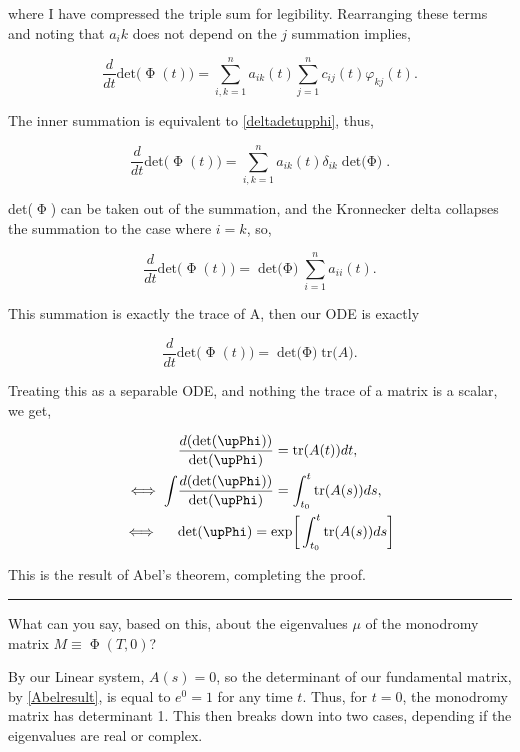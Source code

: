 \documentclass[12pt]{article}
\newcommand{\jump}{\vspace{5mm}}
\begin{document}
\begin{enumerate}[]
\begin{solution}
        where I have compressed the triple sum for legibility. Rearranging these terms and noting that $a_ik$ does not depend on the $j$ summation implies,

        \[
        \frac{d}{dt}\text{det($\upPhi(t)$)} = \sum_{i,k = 1}^na_{ik}(t)\sum_{j = 1}^n c_{ij}(t)\varphi_{kj}(t).
        \]

        The inner summation is equivalent to \ref{deltadetupphi}, thus,

        \[        
        \frac{d}{dt}\text{det($\upPhi(t)$)} = \sum_{i,k = 1}^na_{ik}(t)\delta_{ik}\text{det($\upPhi$)}.
        \]

        det($\upPhi$) can be taken out of the summation, and the Kronnecker delta collapses the summation to the case where $i = k$, so,

        \[        
        \frac{d}{dt}\text{det($\upPhi(t)$)} = \text{det($\upPhi$)}\sum_{i = 1}^na_{ii}(t).
        \]

        This summation is exactly the trace of A, then our ODE is exactly

        \[
        \frac{d}{dt}\text{det($\upPhi(t)$)} = \text{det($\upPhi$)}\text{tr($A$)}.
        \]

        Treating this as a separable ODE, and nothing the trace of a matrix is a scalar, we get,

        \begin{align}
        &\frac{d(\text{det($\upPhi$)})}{\text{det($\upPhi$)}} = \text{tr($A(t)$)}dt, \nonumber\\
         \iff \int &\frac{d(\text{det($\upPhi$)})}{\text{det($\upPhi$)}} = \int_{t_0}^t \text{tr($A(s)$)}ds, \nonumber\\
         \iff \hspace{5mm}&\text{det($\upPhi$)} = \text{exp}\bigg[ \int_{t_0}^t\text{tr($A(s)$)$ds$}\bigg] \label{Abelresult}
        \end{align}

        This is the result of Abel's theorem, completing the proof. 
        \end{solution}

        \jump
        \hrule
        \jump
        What can you say, based on this, about the eigenvalues $\mu$ of the monodromy matrix $M \equiv \upPhi(T,0)$?

        \jump
        \begin{solution}
        
            By our Linear system, $A(s) = 0$, so the determinant of our fundamental matrix, by \ref{Abelresult}, is equal to $e^0 = 1$ for any time $t$. Thus, for $t = 0$, the monodromy matrix has determinant 1. This then breaks down into two cases, depending if the eigenvalues are real or complex.


\end{solution}
\end{enumerate}
\end{document}
